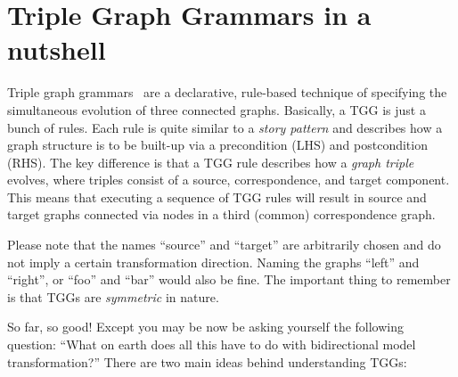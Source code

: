 \section{Triple Graph Grammars in a nutshell}
\label{sec:nutshell}
\genHeader

Triple graph grammars~\cite{tgg:schuerr_94,sk2008,Klar2010} are a declarative, rule-based technique of specifying the simultaneous evolution of three connected
graphs. Basically, a TGG is just a bunch of rules. Each rule is quite similar to a \emph{story pattern} and describes how a graph structure is to be built-up
via a precondition (LHS) and postcondition (RHS). The key difference is that a TGG rule describes how a \emph{graph triple} evolves, where
triples consist of a source, correspondence, and target component. This means that executing a sequence of TGG rules will result in source and target graphs
connected via nodes in a third (common) correspondence graph.

\vspace{0.25cm}

Please note that the names ``source'' and ``target'' are arbitrarily chosen and do not imply a certain transformation direction. Naming the graphs ``left'' and
``right'', or ``foo'' and ``bar'' would also be fine. The important thing to remember is that TGGs are \emph{symmetric} in nature.

\vspace{0.25cm}

So far, so good! Except you may be now be asking yourself the following question: ``What on earth does all this have to do with bidirectional model
transformation?'' There are two main ideas behind understanding TGGs:

